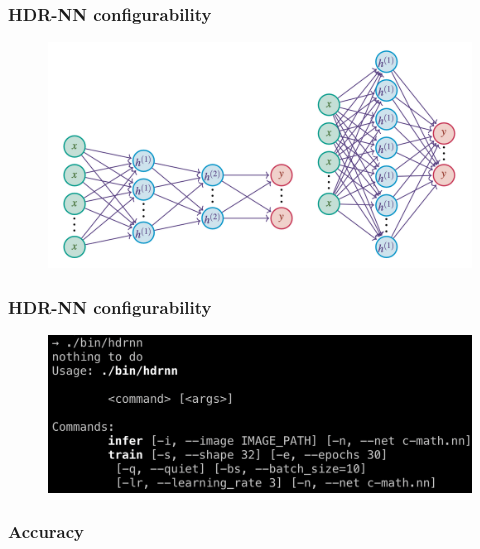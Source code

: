\documentclass{beamer}
\begin{document}
\begin{frame}
\begin{figure}
  \end{figure}

\end{frame}

\begin{frame}
  \frametitle{HDR-NN configurability}

  \begin{figure}
    \centering
    \includegraphics[scale=0.37]{images/networks.png}
  \end{figure}

\end{frame}

\begin{frame}
  \frametitle{HDR-NN configurability}

  \begin{figure}
    \centering
    \includegraphics[scale=0.37]{images/usage.png}
  \end{figure}

\end{frame}

\begin{frame}
  \frametitle{Accuracy}

  \begin{figure}[!ht]
    \centering
    \scalebox{0.52}{
      }
  \end{figure}

\end{frame}
\end{document}
